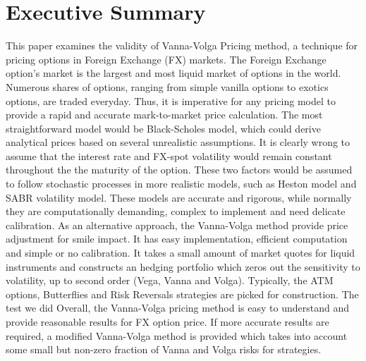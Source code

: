\chapter{Executive Summary}
This paper examines the validity of Vanna-Volga Pricing method, a technique for pricing options in Foreign Exchange (FX) markets. \newline
The Foreign Exchange option's market is the largest and most liquid market of options in the world. Numerous shares of options, ranging from simple vanilla options to exotics options, are traded everyday. Thus, it is imperative for any pricing model to provide a rapid and accurate mark-to-market price calculation.\newline
The most straightforward model would be Black-Scholes model, which could derive analytical prices based on several unrealistic assumptions. It is clearly wrong to assume that the interest rate and FX-spot volatility would remain constant throughout the the maturity of the option. These two factors would be assumed to follow stochastic processes in more realistic models, such as Heston model and SABR volatility model. These models are accurate and rigorous, while normally they are computationally demanding, complex to implement and need delicate calibration. \newline
As an alternative approach, the Vanna-Volga method provide price adjustment for smile impact. It has easy implementation, efficient computation and simple or no calibration. It takes a small amount of market quotes for liquid instruments and constructs an hedging portfolio which zeros out the sensitivity to volatility, up to second order (Vega, Vanna and Volga). Typically, the ATM options, Butterflies and Risk Reversals strategies are picked for construction. \newline
{The test we did} \newline
Overall, the Vanna-Volga pricing method is easy to understand and provide reasonable results for FX option price. If more accurate results are required, a modified Vanna-Volga method is provided which takes into account some small but non-zero fraction of Vanna and Volga risks for strategies.